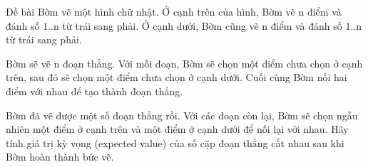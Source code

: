 Đề bài  
Bờm vẽ một hình chữ nhật. Ở cạnh trên của hình, Bờm vẽ n điểm và đánh số 1..n từ trái sang phải. Ở cạnh dưới, Bờm cũng vẽ n điểm và đánh số 1..n từ trái sang phải.  

   Bờm sẽ vẽ n đoạn thẳng. Với mỗi đoạn, Bờm sẽ chọn một điểm chưa chọn ở cạnh trên, sau đó sẽ chọn một điểm chưa chọn ở cạnh dưới. Cuối cùng Bờm nối hai điểm với nhau để tạo thành đoạn thẳng.  

   Bờm đã vẽ được một số đoạn thẳng rồi. Với các đoạn còn lại, Bờm sẽ chọn ngẫu nhiên một điểm ở cạnh trên và một điểm ở cạnh dưới để nối lại với nhau. Hãy tính giá trị kỳ vọng (expected value) của số cặp đoạn thẳng cắt nhau sau khi Bờm hoàn thành bức vẽ.